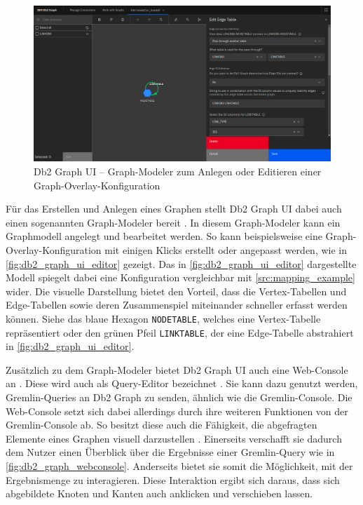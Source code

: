 \begin{figure}[ht]
    \centering
    \includegraphics[width=\textwidth]{images/db2_graph_editor.png}
    \vspace{0.1em}
    \caption[Db2 Graph UI -- Graph-Modeler]{Db2 Graph UI -- Graph-Modeler zum Anlegen oder Editieren einer Graph-Overlay-Konfiguration}
    \label{fig:db2_graph_ui_editor}
\end{figure}

Für das Erstellen und Anlegen eines Graphen stellt Db2 Graph UI dabei auch einen sogenannten Graph-Modeler bereit \cite{ibm_docs_db2_graph_ui}. In diesem Graph-Modeler kann ein Graphmodell angelegt und bearbeitet werden. So kann beispielsweise eine Graph-Overlay-Konfiguration mit einigen Klicks erstellt oder angepasst werden, wie in \autoref{fig:db2_graph_ui_editor} gezeigt. Das in \autoref{fig:db2_graph_ui_editor} dargestellte Modell spiegelt dabei eine Konfiguration vergleichbar mit \autoref{src:mapping_example} wider. Die visuelle Darstellung bietet den Vorteil, dass die Vertex-Tabellen und Edge-Tabellen sowie deren Zusammenspiel miteinander schneller erfasst werden können. Siehe das blaue Hexagon \texttt{NODETABLE}, welches eine Vertex-Tabelle repräsentiert oder den grünen Pfeil \texttt{LINKTABLE}, der eine Edge-Tabelle abstrahiert in \autoref{fig:db2_graph_ui_editor}.

Zusätzlich zu dem Graph-Modeler bietet Db2 Graph UI auch eine Web-Console an \cite{ibm_docs_db2_graph_ui}. Diese wird auch als Query-Editor bezeichnet \cite{ibm_docs_db2_graph_ui}. Sie kann dazu genutzt werden, Gremlin-Queries an Db2 Graph zu senden, ähnlich wie die Gremlin-Console. Die Web-Console setzt sich dabei allerdings durch ihre weiteren Funktionen von der Gremlin-Console ab. So besitzt diese auch die Fähigkeit, die abgefragten Elemente eines Graphen visuell darzustellen \cite{ibm_docs_db2_graph_ui}. Einerseits verschafft sie dadurch dem Nutzer einen Überblick über die Ergebnisse einer Gremlin-Query wie in \autoref{fig:db2_graph_webconsole}. Anderseits bietet sie somit die Möglichkeit, mit der Ergebnismenge zu interagieren. Diese Interaktion ergibt sich daraus, dass sich abgebildete Knoten und Kanten auch anklicken und verschieben lassen.

